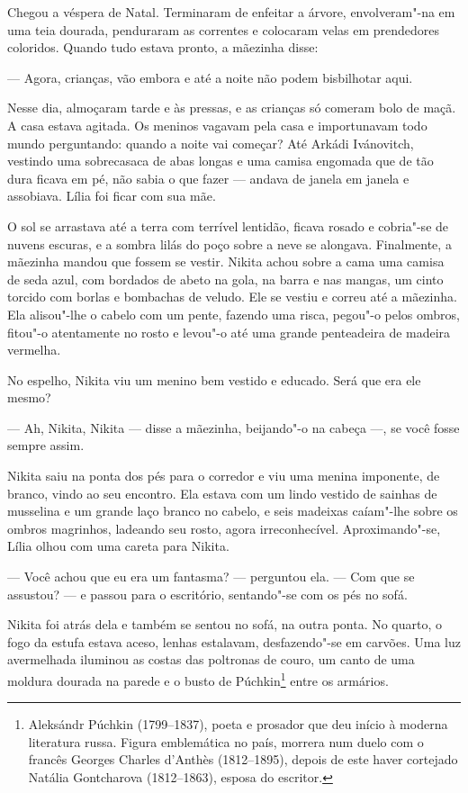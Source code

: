 Chegou a véspera de Natal. Terminaram de enfeitar a árvore,
envolveram"-na em uma teia dourada, penduraram as correntes e colocaram
velas em prendedores coloridos. Quando tudo estava pronto, a mãezinha
disse:

--- Agora, crianças, vão embora e até a noite não podem bisbilhotar
aqui.

Nesse dia, almoçaram tarde e às pressas, e as crianças só comeram bolo
de maçã. A casa estava agitada. Os meninos vagavam pela casa e
importunavam todo mundo perguntando: quando a noite vai começar? Até
Arkádi Ivánovitch, vestindo uma sobrecasaca de abas longas e uma camisa
engomada que de tão dura ficava em pé, não sabia o que fazer --- andava
de janela em janela e assobiava. Lília foi ficar com sua mãe.

O sol se arrastava até a terra com terrível lentidão, ficava rosado e
cobria"-se de nuvens escuras, e a sombra lilás do poço sobre a neve se
alongava. Finalmente, a mãezinha mandou que fossem se vestir. Nikita
achou sobre a cama uma camisa de seda azul, com bordados de abeto na
gola, na barra e nas mangas, um cinto torcido com borlas e bombachas de
veludo. Ele se vestiu e correu até a mãezinha. Ela alisou"-lhe o cabelo
com um pente, fazendo uma risca, pegou"-o pelos ombros, fitou"-o
atentamente no rosto e levou"-o até uma grande penteadeira de madeira
vermelha.

No espelho, Nikita viu um menino bem vestido e educado. Será que era
ele mesmo?

--- Ah, Nikita, Nikita --- disse a mãezinha, beijando"-o na cabeça ---,
se você fosse sempre assim.

Nikita saiu na ponta dos pés para o corredor e viu uma menina imponente,
de branco, vindo ao seu encontro. Ela estava com um lindo vestido de
sainhas de musselina e um grande laço branco no cabelo, e seis madeixas
caíam"-lhe sobre os ombros magrinhos, ladeando seu rosto, agora
irreconhecível. Aproximando"-se, Lília olhou com uma careta para Nikita.

--- Você achou que eu era um fantasma? --- perguntou ela. --- Com que se
assustou? --- e passou para o escritório, sentando"-se com os pés no
sofá.

Nikita foi atrás dela e também se sentou no sofá, na outra ponta. No
quarto, o fogo da estufa estava aceso, lenhas estalavam, desfazendo"-se
em carvões. Uma luz avermelhada iluminou as costas das poltronas de
couro, um canto de uma moldura dourada na parede e o busto de Púchkin\footnote{Aleksándr Púchkin (1799--1837), poeta e prosador que deu início à moderna literatura russa. Figura emblemática no país, morrera num duelo com o francês Georges Charles d’Anthès (1812--1895), depois de este haver cortejado Natália Gontcharova (1812--1863), esposa do escritor.}
entre os armários.

